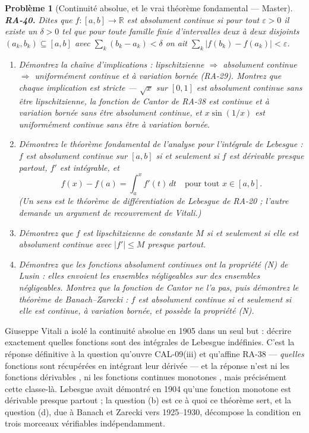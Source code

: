 \documentclass[11pt]{article}
\newtheorem{problem}{Problème}
\begin{document}
\begin{problem}[{Continuité absolue, et le vrai théorème fondamental --- Master}]
\textbf{RA-40.} Dites que $ f : [a,b] \to \mathbb{R} $ est \textit{absolument continue} si pour
tout $ \varepsilon > 0 $ il existe un $ \delta > 0 $ tel que pour toute famille finie
d'intervalles deux à deux disjoints $ (a_k,b_k) \subseteq [a,b] $ avec
$ \sum_k (b_k - a_k) < \delta $ on ait $ \sum_k |f(b_k)-f(a_k)| < \varepsilon $.
\begin{enumerate}
\item[(a)] Démontrez la chaîne d'implications : lipschitzienne $ \Rightarrow $ absolument continue
$ \Rightarrow $ uniformément continue et à variation bornée (RA-29). Montrez que chaque
implication est stricte --- $ \sqrt{x} $ sur $ [0,1] $ est absolument continue sans être
lipschitzienne, la fonction de Cantor de RA-38 est continue et à variation bornée sans être
absolument continue, et $ x\sin(1/x) $ est uniformément continue sans être à variation
bornée.
\item[(b)] Démontrez le théorème fondamental de l'analyse pour l'intégrale de Lebesgue : $ f $ est
absolument continue sur $ [a,b] $ si et seulement si $ f $ est dérivable presque partout,
$ f' $ est intégrable, et
\[ f(x) - f(a) = \int_a^x f'(t)\,dt \quad \text{pour tout } x \in [a,b]. \]
(Un sens est le théorème de différentiation de Lebesgue de RA-20 ; l'autre demande un argument de
recouvrement de Vitali.)
\item[(c)] Démontrez que $ f $ est lipschitzienne de constante $ M $ si et seulement si elle est
absolument continue avec $ |f'| \le M $ presque partout.
\item[(d)] Démontrez que les fonctions absolument continues ont la propriété (N) de Lusin : elles envoient
les ensembles négligeables sur des ensembles négligeables. Montrez que la fonction de Cantor ne l'a
pas, puis démontrez le théorème de Banach--Zarecki : $ f $ est absolument continue si et
seulement si elle est continue, à variation bornée, et possède la propriété (N).
\end{enumerate}

\end{problem}

\noindent Giuseppe Vitali a isolé la continuité absolue en 1905 dans un seul but : décrire
exactement quelles fonctions sont des intégrales de Lebesgue indéfinies. C'est la réponse définitive
à la question qu'ouvre CAL-09(iii) et qu'affine RA-38 --- \textit{quelles} fonctions sont récupérées en
intégrant leur dérivée --- et la réponse n'est ni \og{} les fonctions dérivables \fg{}, ni \og{} les fonctions
continues monotones \fg{}, mais précisément cette classe-là. Lebesgue avait démontré en 1904 qu'une
fonction monotone est dérivable presque partout ; la question (b) est ce à quoi ce théorème sert, et
la question (d), due à Banach et Zarecki vers 1925--1930, décompose la condition en trois
morceaux vérifiables indépendamment.
\end{document}
